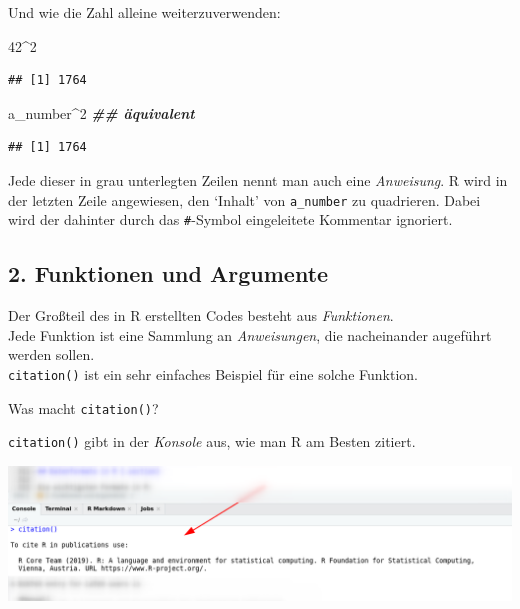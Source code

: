 \documentclass[
]{book}
\newenvironment{Shaded}{\begin{snugshade}}{\end{snugshade}}
\newcommand{\DecValTok}[1]{\textcolor[rgb]{0.00,0.00,0.81}{#1}}
\newcommand{\DocumentationTok}[1]{\textcolor[rgb]{0.56,0.35,0.01}{\textbf{\textit{#1}}}}
\newcommand{\NormalTok}[1]{#1}
\newcommand{\SpecialCharTok}[1]{\textcolor[rgb]{0.00,0.00,0.00}{#1}}
\begin{document}
Und wie die Zahl alleine weiterzuverwenden:

\begin{Shaded}
\begin{Highlighting}[]
\DecValTok{42}\SpecialCharTok{\^{}}\DecValTok{2}
\end{Highlighting}
\end{Shaded}

\begin{verbatim}
## [1] 1764
\end{verbatim}

\begin{Shaded}
\begin{Highlighting}[]
\NormalTok{a\_number}\SpecialCharTok{\^{}}\DecValTok{2} \DocumentationTok{\#\# äquivalent}
\end{Highlighting}
\end{Shaded}

\begin{verbatim}
## [1] 1764
\end{verbatim}

Jede dieser in grau unterlegten Zeilen nennt man auch eine \emph{Anweisung}. R wird in der letzten Zeile angewiesen, den `Inhalt' von \texttt{a\_number} zu quadrieren. Dabei wird der dahinter durch das \texttt{\#}-Symbol eingeleitete Kommentar ignoriert.

\hypertarget{funktionen-und-argumente}{%
\subsection{2. Funktionen und Argumente}\label{funktionen-und-argumente}}

Der Großteil des in R erstellten Codes besteht aus \emph{Funktionen}.\\
Jede Funktion ist eine Sammlung an \emph{Anweisungen}, die nacheinander augeführt werden sollen.\\
\texttt{citation()} ist ein sehr einfaches Beispiel für eine solche Funktion.

Was macht \texttt{citation()}?

\texttt{citation()} gibt in der \emph{Konsole} aus, wie man R am Besten zitiert.

\begin{center}\includegraphics[width=0.8\linewidth]{imgs/citation} \end{center}
\end{document}
